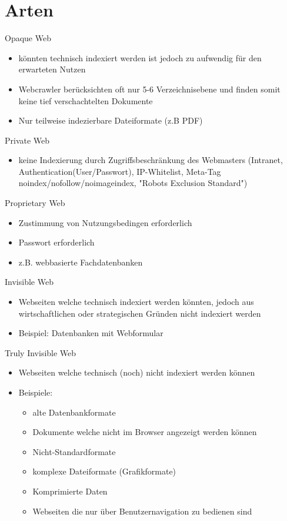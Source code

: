 \documentclass[12pt]{beamer}
\begin{document}
\section{Arten}
\begin{frame}{Opaque Web}
	\begin{itemize}
		\item könnten technisch indexiert werden ist jedoch zu aufwendig für den erwarteten Nutzen
		\item Webcrawler berücksichten oft nur 5-6 Verzeichnisebene und finden somit keine tief verschachtelten Dokumente
		\item Nur teilweise indezierbare Dateiformate (z.B PDF)
	\end{itemize}
\end{frame}
\begin{frame}{Private Web}
	\begin{itemize}
		\item keine Indexierung durch Zugriffsbeschränkung des Webmasters (Intranet, Authentication(User/Passwort), IP-Whitelist, Meta-Tag noindex/nofollow/noimageindex, "Robots Exclusion Standard")
	\end{itemize}
\end{frame}
\begin{frame}{Proprietary Web}
	\begin{itemize}
		\item Zustimmung von Nutzungsbedingen erforderlich
		\item Passwort erforderlich
		\item z.B. webbasierte Fachdatenbanken
	\end{itemize}
\end{frame}
\begin{frame}{Invisible Web}
	\begin{itemize}
		\item Webseiten welche technisch indexiert werden könnten, jedoch aus wirtschaftlichen oder strategischen Gründen nicht indexiert werden
		\item Beispiel: Datenbanken mit Webformular
	\end{itemize}
\end{frame}
\begin{frame}{Truly Invisible Web}
	\begin{itemize}
		\item Webseiten welche technisch (noch) nicht indexiert werden können
		\item Beispiele:
		\begin{itemize}
			\item alte Datenbankformate
			\item Dokumente welche nicht im Browser angezeigt werden können
			\item Nicht-Standardformate
			\item komplexe Dateiformate (Grafikformate)
			\item Komprimierte Daten
			\item Webseiten die nur über Benutzernavigation zu bedienen sind
		\end{itemize}
	\end{itemize} 
\end{frame}
\end{document}
